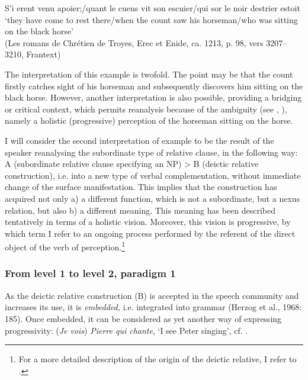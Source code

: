 \documentclass[output=paper]{langsci/langscibook}
\begin{document}
\ea \label{ex:kragh:12} S’i erent venu apoier;/quant le cuens vit son escuier/qui sor le noir destrier estoit \\
    ‘they have come to rest there/when the count saw his horseman/who was sitting on the black horse’\\
    (Les romans de Chrétien de Troyes, Erec et Enide, ca. 1213, p. 98, vers 3207–3210, Frantext)
\z


The interpretation of this example is twofold. The point may be that the count firstly catches sight of his horseman and subsequently discovers him sitting on the black horse. However, another interpretation is also possible, providing a bridging or critical context, which permits reanalysis because of the ambiguity (see \citealt[117]{Diewald2002}, \citealt{Heine2002}), namely a holistic (progressive) perception of the horseman sitting on the horse.

I will consider the second interpretation of example  to be the result of the speaker reanalysing the subordinate type of relative clause, in the following way: A (subordinate relative clause specifying an NP) > B (deictic relative construction), i.e. into a new type of verbal complementation, without immediate change of the surface manifestation. This implies that the construction has acquired not only a) a different function, which is not a subordinate, but a nexus relation, but also b) a different meaning. This meaning has been described tentatively in terms of a holistic vision. Moreover, this vision is progressive, by which term I refer to an ongoing process performed by the referent of the direct object of the verb of perception.\footnote{For a more detailed description of the origin of the deictic relative, I refer to \citet[178--182]{KraghSchosler2014}.}

 \subsubsection{From level 1 to level 2, paradigm 1} \label{kragh:4.1.1}


As the deictic relative construction (B) is accepted in the speech community and increases its use, it is \textit{embedded,} i.e. integrated into grammar (Herzog et al., 1968:  185). Once embedded, it can be considered as yet another way of expressing progressivity: (\textit{Je vois}) \textit{Pierre qui chante}, ‘I see Peter singing’, cf. .
\end{document}
